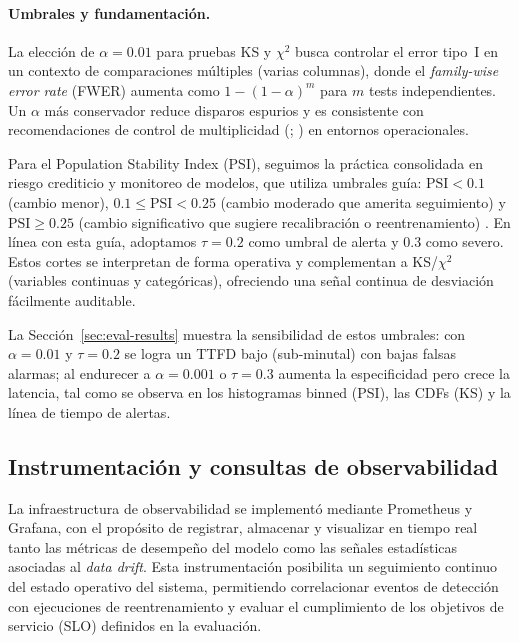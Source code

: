 \paragraph{Umbrales y fundamentación.}
La elección de $\alpha=0.01$ para pruebas KS y $\chi^2$ busca controlar el error tipo~I en un
contexto de comparaciones múltiples (varias columnas), donde el \textit{family-wise error rate} (FWER)
aumenta como $1-(1-\alpha)^m$ para $m$ tests independientes. Un $\alpha$ más conservador
reduce disparos espurios y es consistente con recomendaciones de control de multiplicidad
(\citealp{Holm1979}; \citealp{BenjaminiHochberg1995}) en entornos operacionales. 

Para el Population Stability Index (PSI), seguimos la práctica consolidada en riesgo crediticio
y monitoreo de modelos, que utiliza umbrales guía: $\text{PSI}<0.1$ (cambio menor), $0.1\leq\text{PSI}<0.25$
(cambio moderado que amerita seguimiento) y $\text{PSI}\geq 0.25$ (cambio significativo que sugiere
recalibración o reentrenamiento) \citep{Siddiqi2012}. En línea con esta guía, adoptamos
$\tau=0.2$ como umbral de alerta y $0.3$ como severo. Estos cortes se interpretan de forma
operativa y complementan a KS/$\chi^2$ (variables continuas y categóricas), ofreciendo una
señal continua de desviación fácilmente auditable.

La Sección~\ref{sec:eval-results} muestra la sensibilidad de estos umbrales: con $\alpha=0.01$ y
$\tau=0.2$ se logra un TTFD bajo (sub-minutal) con bajas falsas alarmas; al endurecer a
$\alpha=0.001$ o $\tau=0.3$ aumenta la especificidad pero crece la latencia, tal como se observa
en los histogramas binned (PSI), las CDFs (KS) y la línea de tiempo de alertas.


\subsection{Instrumentación y consultas de observabilidad}
\label{subsec:eval-obs}

La infraestructura de observabilidad se implementó mediante Prometheus y Grafana, con el propósito de registrar, almacenar y visualizar en tiempo real tanto las métricas de desempeño del modelo como las señales estadísticas asociadas al \textit{data drift}. Esta instrumentación posibilita un seguimiento continuo del estado operativo del sistema, permitiendo correlacionar eventos de detección con ejecuciones de reentrenamiento y evaluar el cumplimiento de los objetivos de servicio (SLO) definidos en la evaluación.

